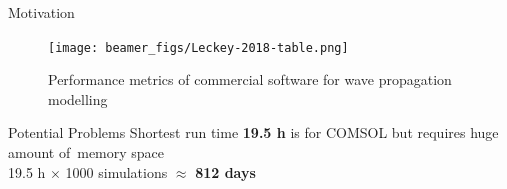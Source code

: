 \documentclass[10pt]{beamer} %
\begin{document}
\begin{frame}[t]{Motivation}
	\begin{figure}
		\texttt{[image: beamer\_figs/Leckey-2018-table.png]}
		\caption{Performance metrics of commercial software for wave propagation modelling}
	\label{fig:Leckey_table}
	\end{figure}
	\begin{alertblock}{Potential Problems}
		Shortest run time \textbf{19.5 h} is for COMSOL but requires huge amount of~memory space\\
		19.5 h $\times$ 1000 simulations $\approx$ \textbf{812 days}
	\end{alertblock}
\end{frame}
\end{document}
